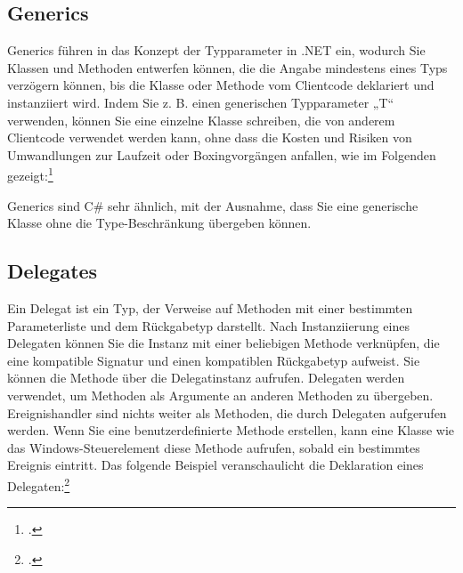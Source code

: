\begin{minipage}{\linewidth}

\end{minipage}


\subsection{Generics}
Generics führen in das Konzept der Typparameter in .NET ein, wodurch Sie Klassen und Methoden entwerfen können, die die Angabe mindestens eines Typs verzögern können, bis die Klasse oder Methode vom Clientcode deklariert und instanziiert wird. Indem Sie z. B. einen generischen Typparameter „T“ verwenden, können Sie eine einzelne Klasse schreiben, die von anderem Clientcode verwendet werden kann, ohne dass die Kosten und Risiken von Umwandlungen zur Laufzeit oder Boxingvorgängen anfallen, wie im Folgenden gezeigt:\footcite[Vgl.  Generics][Abgerufen am \today]{GoogleFlutterSharedPreferences2020} 

Generics sind C\# sehr ähnlich, mit der Ausnahme, dass Sie eine generische Klasse ohne die Type-Beschränkung übergeben können.

\begin{minipage}{\linewidth}

\end{minipage}

\subsection{Delegates}

Ein Delegat ist ein Typ, der Verweise auf Methoden mit einer bestimmten Parameterliste und dem Rückgabetyp darstellt. Nach Instanziierung eines Delegaten können Sie die Instanz mit einer beliebigen Methode verknüpfen, die eine kompatible Signatur und einen kompatiblen Rückgabetyp aufweist. Sie können die Methode über die Delegatinstanz aufrufen.
Delegaten werden verwendet, um Methoden als Argumente an anderen Methoden zu übergeben. Ereignishandler sind nichts weiter als Methoden, die durch Delegaten aufgerufen werden. Wenn Sie eine benutzerdefinierte Methode erstellen, kann eine Klasse wie das Windows-Steuerelement diese Methode aufrufen, sobald ein bestimmtes Ereignis eintritt. Das folgende Beispiel veranschaulicht die Deklaration eines Delegaten:\footcite[Vgl.  Delegaten
][Abgerufen am \today]{GoogleFlutterSharedPreferences2020} 

